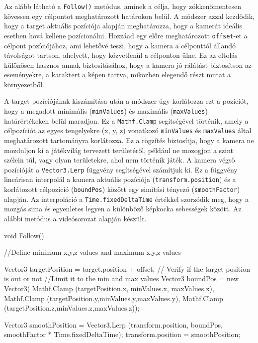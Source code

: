 Az alább látható a \texttt{Follow()} metódus, aminek a  célja, hogy zökkenőmentesen kövessen egy célpontot meghatározott határokon belül. A módszer azzal kezdődik, hogy a target aktuális pozíciója alapján meghatározza, hogy a kamerát ideális esetben hová kellene pozícionálni. Hozzáad egy előre meghatározott \texttt{offset}-et a célpont pozíciójához, ami lehetővé teszi, hogy a kamera a célponttól állandó távolságot tartson, ahelyett, hogy közvetlenül a célponton ülne. Ez az eltolás különösen hasznos annak biztosításához, hogy a kamera jó rálátást biztosítson az eseményekre, a karaktert a képen tartva, miközben elegendő részt mutat a környezetből. 

A target pozíciójának kiszámítása után a módszer úgy korlátozza ezt a pozíciót, hogy a megadott minimális (\texttt{minValues}) és maximális (\texttt{maxValues}) határértékeken belül maradjon. Ez a \texttt{Mathf.Clamp} segítségével történik, amely a célpozíciót az egyes tengelyekre (x, y, z) vonatkozó \texttt{minValues} és \texttt{maxValues} által meghatározott tartományra korlátozza. Ez a rögzítés biztosítja, hogy a kamera ne mozduljon ki a játékvilág tervezett területéről, például ne mozogjon a szint szélein túl, vagy olyan területekre, ahol nem történik játék.
A kamera végső pozícióját a \texttt{Vector3.Lerp} függvény segítségével számítjuk ki. Ez a függvény lineárisan interpolál a kamera aktuális pozíciója (\texttt{transform.position}) és a korlátozott célpozíció (\texttt{boundPos}) között egy simítási tényező (\texttt{smoothFactor}) alapján. Az interpoláció a \texttt{Time.fixedDeltaTime} értékkel szorzódik meg, hogy a mozgás sima és egyenletes legyen a különböző képkocka sebességek között. Az alábbi metódus a \cite{youtubeplaylist} videósorozat alapján készült.

\begin{java}
void Follow()
{
    //Define minimum x,y,z values and maximum x,y,z values

    Vector3 targetPosition = target.position + offset;
    // Verify if the target position is out or not
    //Limit it to the min and max values
    Vector3 boundPos = new Vector3(
        Mathf.Clamp
        (targetPosition.x, minValues.x, maxValues.x),
        Mathf.Clamp
        (targetPosition.y,minValues.y,maxValues.y),
        Mathf.Clamp
        (targetPosition.z,minValues.z,maxValues.z));

    Vector3 smoothPosition = 
        Vector3.Lerp
        (transform.position, boundPos, 
        smoothFactor * Time.fixedDeltaTime);
    transform.position = smoothPosition;
}
\end{java}

